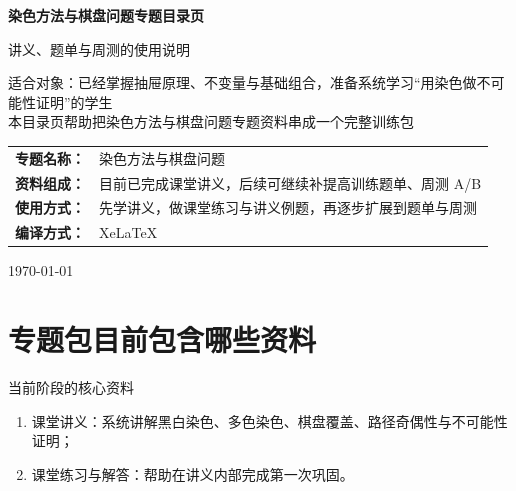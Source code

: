 \documentclass[11pt,a4paper,fontset=fandol]{ctexart}
\begin{document}
\thispagestyle{empty}
\begin{titlepage}
\centering
\vspace*{0.9cm}

\begin{tcolorbox}[
  enhanced,
  width=0.92\textwidth,
  colback=white,
  colframe=mainblue,
  boxrule=1pt,
  arc=0mm,
  left=6mm,
  right=6mm,
  top=8mm,
  bottom=8mm
]
\centering

{\fontsize{24}{30}\selectfont\bfseries 染色方法与棋盘问题专题目录页\par}
\vspace{0.65cm}
{\fontsize{17}{22}\selectfont 讲义、题单与周测的使用说明\par}

\vspace{1cm}
\begin{tcolorbox}[colback=lightblue,colframe=mainblue,width=0.84\textwidth,boxrule=1pt]
\centering
{\large 适合对象：已经掌握抽屉原理、不变量与基础组合，准备系统学习“用染色做不可能性证明”的学生}\\[0.35em]
{\normalsize 本目录页帮助把染色方法与棋盘问题专题资料串成一个完整训练包}
\end{tcolorbox}

\vspace{1.0cm}
\renewcommand{\arraystretch}{1.42}
\begin{tabular}{>{\bfseries}p{3.5cm}p{8cm}}
专题名称： & 染色方法与棋盘问题 \\
资料组成： & 目前已完成课堂讲义，后续可继续补提高训练题单、周测 A/B \\
使用方式： & 先学讲义，做课堂练习与讲义例题，再逐步扩展到题单与周测 \\
编译方式： & XeLaTeX \\
\end{tabular}

\vspace{0.9cm}
{\large \today\par}
\end{tcolorbox}
\end{titlepage}

\tableofcontents
\newpage

\section{专题包目前包含哪些资料}

\begin{goalbox}{当前阶段的核心资料}
\begin{enumerate}
  \item 课堂讲义：系统讲解黑白染色、多色染色、棋盘覆盖、路径奇偶性与不可能性证明；
  \item 课堂练习与解答：帮助在讲义内部完成第一次巩固。
\end{enumerate}
\end{goalbox}
\end{document}
